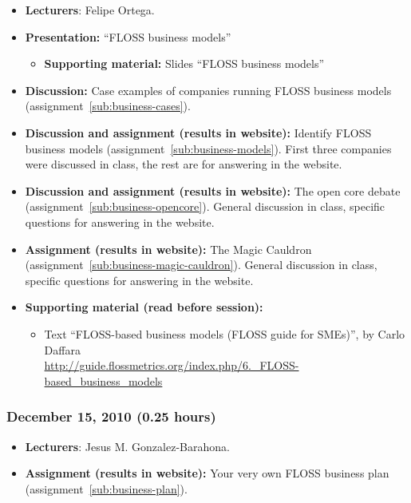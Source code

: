 \documentclass[a4paper]{article}
\begin{document}
\begin{itemize}
\item \textbf{Lecturers}: Felipe Ortega.
\item \textbf{Presentation:} ``FLOSS business models''
  \begin{itemize}
  \item \textbf{Supporting material:} Slides ``FLOSS business models''
  \end{itemize}
\item \textbf{Discussion:} Case examples of companies running FLOSS business models (assignment~\ref{sub:business-cases}).
\item \textbf{Discussion and assignment (results in website):} Identify FLOSS
business models (assignment~\ref{sub:business-models}). First three companies were discussed in class, the rest are for answering in the website.
\item \textbf{Discussion and assignment (results in website):} The open core debate (assignment~\ref{sub:business-opencore}). General discussion in class, specific questions for answering in the website.
\item \textbf{Assignment (results in website):} The Magic Cauldron (assignment~\ref{sub:business-magic-cauldron}). General discussion in class, specific questions for answering in the website.
\item \textbf{Supporting material (read before session):}
  \begin{itemize}
  \item Text ``FLOSS-based business models (FLOSS guide for SMEs)'', by Carlo Daffara \\
    \url{http://guide.flossmetrics.org/index.php/6._FLOSS-based_business_models}
  \end{itemize}
\end{itemize}

\subsubsection{December 15, 2010 (0.25 hours)}

\begin{itemize}
\item \textbf{Lecturers}: Jesus M. Gonzalez-Barahona.
\item \textbf{Assignment (results in website):} Your very own FLOSS
  business plan (assignment~\ref{sub:business-plan}).
\end{itemize}
\end{document}
